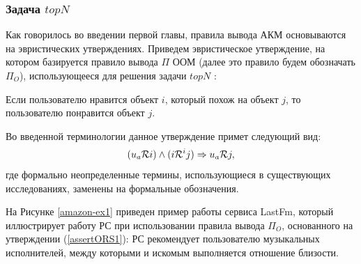 
\subsubsection{Задача $topN$}
Как говорилось во введении первой главы, правила вывода АКМ
основываются на эвристических утверждениях. Приведем эвристическое утверждение,
на котором базируется правило вывода $\Pi$ ООМ (далее это правило будем
обозначать $\Pi_O$), использующееся для решения
задачи $topN$ \cite{item-based,topn1,amazon-item2item}:
\begin{assert}\label{assertORS1}
Если пользователю нравится объект $i$, который
похож на объект $j$, то пользователю понравится объект $j$.
\end{assert}

Во введенной
терминологии данное утверждение примет следующий вид:
\begin{equation}
\label{ors-assert}
(u_a \mathcal{R} i) \wedge (i \mathcal{R}^i j) \Rightarrow u_a \mathcal{R} j,
\end{equation}
где формально неопределенные термины, использующиеся в существующих
исследованиях, заменены на формальные обозначения.

На Рисунке \ref{amazon-ex1} приведен пример работы
сервиса LastFm, который иллюстрирует
работу РС при использовании правила вывода $\Pi_O$, основанного на утверждении
(\ref{assertORS1}): РС рекомендует пользователю музыкальных исполнителей,
между которыми и искомым выполняется отношение близости.

